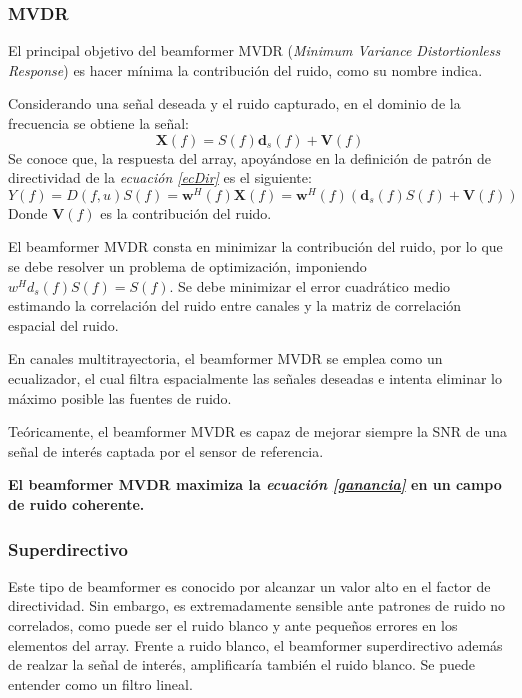 \documentclass[a4paper,11pt]{book}
\begin{document}
		\subsubsection{MVDR}
		El principal objetivo del beamformer MVDR (\textit{Minimum Variance Distortionless Response}) es hacer mínima la contribución del ruido, como su nombre indica.
		
		Considerando una señal deseada y el ruido capturado, en el dominio de la frecuencia se obtiene la señal:
		\begin{equation}
		\textbf{X}(f) = S(f)\textbf{d}_{s}(f) + \textbf{V}(f)
		\end{equation}
	Se conoce que, la respuesta del array, apoyándose en la definición de patrón de directividad de la \textit{ecuación \ref{ecDir}} es el siguiente:
	\begin{equation}
	Y(f) = D(f,u) S(f) = \textbf{w}^{H}(f) \textbf{X}(f) = \textbf{w}^{H}(f)(\textbf{d}_{s}(f) S(f) + \textbf{V}(f))
	\end{equation}
	Donde $\textbf{V}(f)$ es la contribución del ruido.
	
	El beamformer MVDR consta en minimizar la contribución del ruido, por lo que se debe resolver un problema de optimización, imponiendo $w^{H} d_{s}(f) S(f) = S(f)$. Se debe minimizar el error cuadrático medio estimando la correlación del ruido entre canales y la matriz de correlación espacial del ruido.
	
	En canales multitrayectoria, el beamformer MVDR se emplea como un ecualizador, el cual filtra espacialmente las señales deseadas e intenta eliminar lo máximo posible las fuentes de ruido.
	
	Teóricamente, el beamformer MVDR es capaz de mejorar siempre la SNR de una señal de interés captada por el sensor de referencia.
	
	\textbf{		El beamformer MVDR maximiza la \textit{ecuación \ref{ganancia}} en un campo de ruido coherente.}
	
	\subsubsection{Superdirectivo}
	Este tipo de beamformer es conocido por alcanzar un valor alto en el factor de directividad. Sin embargo, es extremadamente sensible ante patrones de ruido no correlados, como puede ser el ruido blanco y ante pequeños errores en los elementos del array. Frente a ruido blanco, el beamformer superdirectivo además de realzar la señal de interés, amplificaría también el ruido blanco. Se puede entender como un filtro lineal.
	
\end{document}
